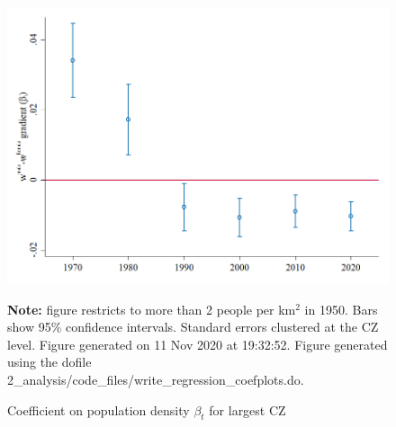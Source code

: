 \begin{figure}[!h]
\centering
\caption{Coefficient on population density $ \beta_t $ for largest CZ}
\includegraphics[width=1\textwidth]{../2_analysis/output/figures/baseline_large_l_czone_density_full_time}
\par \begin{minipage}[h]{\textwidth}{\tiny\textbf{Note:} figure restricts to more than 2 people per km$^2$ in 1950. Bars show 95\% confidence intervals. Standard errors clustered at the CZ level. Figure generated on 11 Nov 2020 at 19:32:52. Figure generated using the dofile 2\_analysis/code\_files/write\_regression\_coefplots.do.}\end{minipage}
\end{figure}
